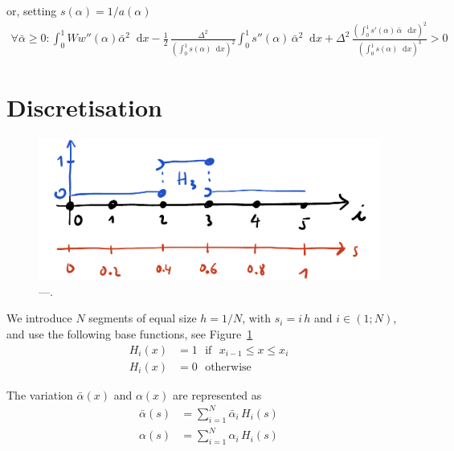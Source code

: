\documentclass[final,3p,times,authoryear]{elsarticle}
\renewcommand*\d{\mathop{}\!\mathrm{d}} %
\begin{document}
or, setting $s(\alpha)=1/a(\alpha)$
\begin{align}
\label{eq:second_varia}
\forall \bar{\alpha} \ge0: \int_0^1 W w''(\alpha) \bar{\alpha}^2 \d x -
 \frac12  \, \frac{\Delta^2}{\left( \int_0^1 s(\alpha) \d x \right)^2}
\int_0^1 s''(\alpha) \, \bar{\alpha}^2 \d x
+
\Delta^2 \, \frac{\left( \int_0^1 s'(\alpha) \, \bar{\alpha} \, \d x \right)^2 }{\left( \int_0^1 s(\alpha) \d x \right)^3}
>0
\end{align}


%
%
%
%
%
%
%
\section{Discretisation} \label{sec:going_discrete}
%
%
%
%
%
%
%
\begin{figure}[htb]
\centering
\includegraphics[width=0.95 \columnwidth]{base_functions}
\caption{\label{fig:base_functions}
---.}
\end{figure}
We introduce $N$ segments of equal size $h=1/N$, with $s_i=i \, h$ and $i \in (1;N)$, and use the following base functions, see Figure~\ref{fig:base_functions}
\begin{subequations}
 \label{eq:base_func}
\begin{align}
H_i(x) &= 1 \text{~ if ~} x_{i-1} \le x \le x_i  \\
H_i(x) &= 0 \text{~ otherwise ~}
\end{align}
\end{subequations}

The variation $\bar{\alpha}(x)$ and $\alpha(x)$ are represented as
\begin{subequations}
\label{eq:discrete_variations}
\begin{align}
\bar{\alpha}(s) &= \sum_{i=1}^N \bar{\alpha}_i \, H_i(s) \label{eq:19a} \\
\alpha(s) &= \sum_{i=1}^N \alpha_i \, H_i(s) \label{eq:19b}
\end{align}
\end{subequations}
\end{document}
